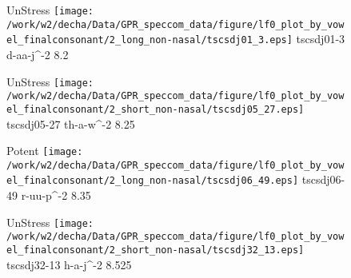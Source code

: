 \documentclass{article}
\begin{document}
\begin{figure}[t]
\begin{minipage}[b]{.24\textwidth}
UnStress
\centering
\texttt{[image: /work/w2/decha/Data/GPR\_speccom\_data/figure/lf0\_plot\_by\_vowel\_finalconsonant/2\_long\_non-nasal/tscsdj01\_3.eps]}
tscsdj01-3 d-aa-j\textasciicircum-2 8.2
\end{minipage}
\begin{minipage}[b]{.24\textwidth}
UnStress
\centering
\texttt{[image: /work/w2/decha/Data/GPR\_speccom\_data/figure/lf0\_plot\_by\_vowel\_finalconsonant/2\_short\_non-nasal/tscsdj05\_27.eps]}
tscsdj05-27 th-a-w\textasciicircum-2 8.25
\end{minipage}
\begin{minipage}[b]{.24\textwidth}
\colorbox{Apricot}{Potent}
\centering
\texttt{[image: /work/w2/decha/Data/GPR\_speccom\_data/figure/lf0\_plot\_by\_vowel\_finalconsonant/2\_long\_non-nasal/tscsdj06\_49.eps]}
tscsdj06-49 r-uu-p\textasciicircum-2 8.35
\end{minipage}
\begin{minipage}[b]{.24\textwidth}
UnStress
\centering
\texttt{[image: /work/w2/decha/Data/GPR\_speccom\_data/figure/lf0\_plot\_by\_vowel\_finalconsonant/2\_short\_non-nasal/tscsdj32\_13.eps]}
tscsdj32-13 h-a-j\textasciicircum-2 8.525
\end{minipage}
\end{figure}
\end{document}
